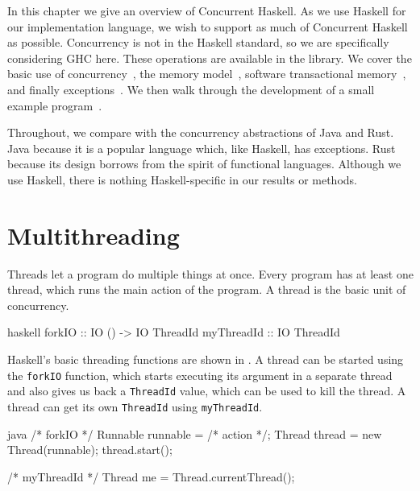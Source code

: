 In this chapter we give an overview of Concurrent
Haskell\cite{peytonjones1996,peytonjones2005}.  As we use Haskell for
our implementation language, we wish to support as much of Concurrent
Haskell as possible.  Concurrency is not in the Haskell standard, so
we are specifically considering GHC here.  These operations are
available in the  library.  We cover the basic
use of concurrency~, the memory
model~, software transactional
memory~, and finally
exceptions~.  We then walk through the
development of a small example
program~.

Throughout, we compare with the concurrency abstractions of
Java\cite{lea1996} and Rust\cite{rust2011}.  Java because it is a
popular language which, like Haskell, has exceptions.  Rust because
its design borrows from the spirit of functional languages.  Although
we use Haskell, there is nothing Haskell-specific in our results or
methods.

\section{Multithreading}
\label{sec:concurrent_haskell-threads}

Threads let a program do multiple things at once.  Every program has
at least one thread, which runs the main action of the program.  A
thread is the basic unit of concurrency.

\begin{listing}
\centering
\begin{cminted}{haskell}
forkIO     :: IO () -> IO ThreadId
myThreadId :: IO ThreadId
\end{cminted}
\caption{Basic threading operations in Haskell.}\label{lst:basic_haskell}
\end{listing}

Haskell's basic threading functions are shown in
.  A thread can be started using the
\verb|forkIO| function, which starts executing its argument in a
separate thread and also gives us back a \verb|ThreadId| value, which
can be used to kill the thread.  A thread can get its own
\verb|ThreadId| using \verb|myThreadId|.

\begin{listing}
\centering
\begin{cminted}{java}
/* forkIO */
Runnable runnable = /* action */;
Thread thread = new Thread(runnable);
thread.start();

/* myThreadId */
Thread me = Thread.currentThread();
\end{cminted}
\caption{Basic threading operations in Java.}\label{lst:basic_java}
\end{listing}

